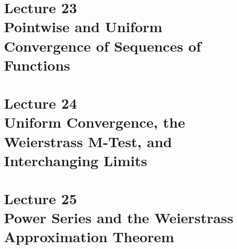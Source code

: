 \documentclass{article}
\begin{document}
\section[Pointwise and Uniform Convergence of Sequences of Functions]{Lecture 23 \\ {\normalsize 	Pointwise and Uniform Convergence of Sequences of Functions}} \newpage 
\section[Uniform Convergence, the Weierstrass M-Test, and Interchanging Limits]{Lecture 24 \\ {\normalsize Uniform Convergence, the Weierstrass M-Test, and Interchanging Limits}} \newpage 
\section[Power Series and the Weierstrass Approximation Theorem]{Lecture 25 \\ {\normalsize Power Series and the Weierstrass Approximation Theorem}}
\end{document}
